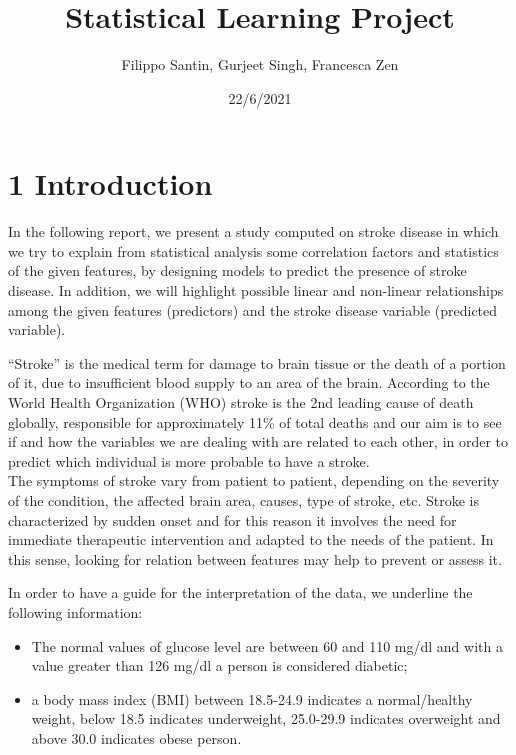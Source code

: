 \documentclass[
]{article}
\title{Statistical Learning Project}
\author{Filippo Santin, Gurjeet Singh, Francesca Zen}
\date{22/6/2021}
\providecommand{\tightlist}{%
  \setlength{\itemsep}{0pt}\setlength{\parskip}{0pt}}
\begin{document}
\maketitle

\hypertarget{introduction}{%
\section{1 Introduction}\label{introduction}}

In the following report, we present a study computed on stroke
disease in which we try to explain from statistical analysis some
correlation factors and statistics of the given features, by designing
models to predict the presence of stroke disease. In addition, we will
highlight possible linear and non-linear relationships among the given
features (predictors) and the stroke disease variable (predicted
variable).

``Stroke'' is the medical term for damage to brain tissue or the death
of a portion of it, due to insufficient blood supply to an area of the
brain. According to the World Health Organization (WHO) stroke is the
2nd leading cause of death globally, responsible for approximately 11\%
of total deaths and our aim is to see if and how the variables we are
dealing with are related to each other, in order to predict which individual is more probable to have a stroke.\\
The symptoms of stroke vary from patient to patient, depending on the
severity of the condition, the affected brain area, causes, type of
stroke, etc. Stroke is characterized by sudden onset and for this reason
it involves the need for immediate therapeutic intervention and adapted
to the needs of the patient. In this sense, looking for relation between
features may help to prevent or assess it.

In order to have a guide for the interpretation of the data, we underline
the following information:

\begin{itemize}
\tightlist
\item
  The normal values of glucose level are between 60 and 110 mg/dl and
  with a value greater than 126 mg/dl a person is considered diabetic;
\item
  a body mass index (BMI) between 18.5-24.9 indicates a normal/healthy
  weight, below 18.5 indicates underweight, 25.0-29.9 indicates
  overweight and above 30.0 indicates obese person.
\end{itemize}
\end{document}
